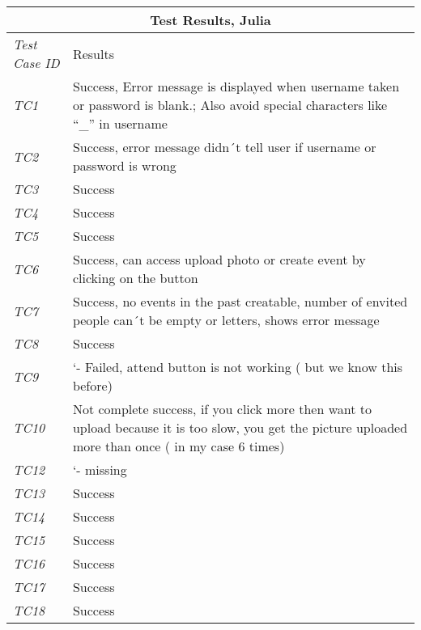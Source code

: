 %
\begin{minipage}{\linewidth}
\setlength{\tabcolsep}{15pt}
\centering
{}
\begin{tabular}{ |l|p{70mm}| }
	\hline
	\multicolumn{2}{|c|}{\cellcolor{gray!25} \textbf{Test Results, Julia}} \\
	\hline
	\it{\cellcolor{gray!25}Test Case ID} & {\cellcolor{gray!25} Results } \\
	\hline
	\it{\cellcolor{gray!25}TC1} & Success, 
Error message is displayed when username taken or password is blank.; Also avoid special characters like “_” in username \\ \hline
	\it{\cellcolor{gray!25}TC2} & Success, error message didn´t tell user if username or password is wrong \\ \hline
	\it{\cellcolor{gray!25}TC3} & Success \\ \hline
	\it{\cellcolor{gray!25}TC4} & Success \\ \hline
	\it{\cellcolor{gray!25}TC5} & Success \\ \hline
	\it{\cellcolor{gray!25}TC6} & Success, can access upload photo or create event by clicking on the button \\ \hline
	\it{\cellcolor{gray!25}TC7} & Success, no events in the past creatable, number of envited people can´t be empty or letters, shows error message \\ \hline
	\it{\cellcolor{gray!25}TC8} & Success \\ \hline
	\it{\cellcolor{gray!25}TC9} & ‘- Failed, attend button is not working ( but we know this before) \\ \hline
	\it{\cellcolor{gray!25}TC10} & Not complete success, if you click more then want to upload because it is too slow, you get the picture uploaded more than once ( in my case 6 times) \\ \hline
	\it{\cellcolor{gray!25}TC12} & ‘- missing \\ \hline
	\it{\cellcolor{gray!25}TC13} & Success \\ \hline
	\it{\cellcolor{gray!25}TC14} & Success \\ \hline
	\it{\cellcolor{gray!25}TC15} & Success \\ \hline
	\it{\cellcolor{gray!25}TC16} & Success \\ \hline
	\it{\cellcolor{gray!25}TC17} & Success \\ \hline
	\it{\cellcolor{gray!25}TC18} & Success \\ \hline
	\hline
\end{tabular}
\medskip
\end{minipage}
